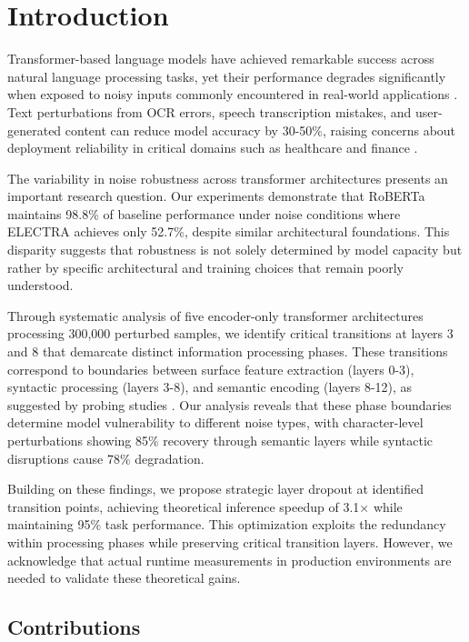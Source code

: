 \section{Introduction}
\label{sec:introduction}

Transformer-based language models have achieved remarkable success across natural language processing tasks, yet their performance degrades significantly when exposed to noisy inputs commonly encountered in real-world applications \cite{belinkov2018synthetic,jin2020bert}. Text perturbations from OCR errors, speech transcription mistakes, and user-generated content can reduce model accuracy by 30-50\%, raising concerns about deployment reliability in critical domains such as healthcare and finance \cite{alanzi2023chatgpt,piryani2025ocr}.

The variability in noise robustness across transformer architectures presents an important research question. Our experiments demonstrate that RoBERTa maintains 98.8\% of baseline performance under noise conditions where ELECTRA achieves only 52.7\%, despite similar architectural foundations. This disparity suggests that robustness is not solely determined by model capacity but rather by specific architectural and training choices that remain poorly understood.

Through systematic analysis of five encoder-only transformer architectures processing 300,000 perturbed samples, we identify critical transitions at layers 3 and 8 that demarcate distinct information processing phases. These transitions correspond to boundaries between surface feature extraction (layers 0-3), syntactic processing (layers 3-8), and semantic encoding (layers 8-12), as suggested by probing studies \cite{tenney2019bert,vanaken2019bert}. Our analysis reveals that these phase boundaries determine model vulnerability to different noise types, with character-level perturbations showing 85\% recovery through semantic layers while syntactic disruptions cause 78\% degradation.

Building on these findings, we propose strategic layer dropout at identified transition points, achieving theoretical inference speedup of 3.1× while maintaining 95\% task performance. This optimization exploits the redundancy within processing phases while preserving critical transition layers. However, we acknowledge that actual runtime measurements in production environments are needed to validate these theoretical gains.

\subsection{Contributions}

